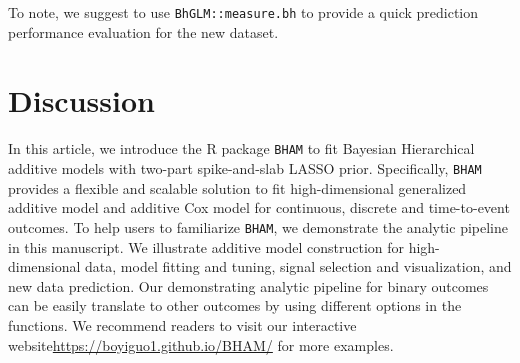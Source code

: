 \documentclass[
]{jss}
\begin{document}
To note, we suggest to use \texttt{BhGLM::measure.bh} to provide a quick
prediction performance evaluation for the new dataset.

\begin{CodeChunk}
\end{CodeChunk}

\section{Discussion}

In this article, we introduce the R package \texttt{BHAM} to fit
Bayesian Hierarchical additive models with two-part spike-and-slab LASSO
prior. Specifically, \texttt{BHAM} provides a flexible and scalable
solution to fit high-dimensional generalized additive model and additive
Cox model for continuous, discrete and time-to-event outcomes. To help
users to familiarize \texttt{BHAM}, we demonstrate the analytic pipeline
in this manuscript. We illustrate additive model construction for
high-dimensional data, model fitting and tuning, signal selection and
visualization, and new data prediction. Our demonstrating analytic
pipeline for binary outcomes can be easily translate to other outcomes
by using different options in the functions. We recommend readers to
visit our interactive website\url{https://boyiguo1.github.io/BHAM/} for
more examples.
\end{document}
